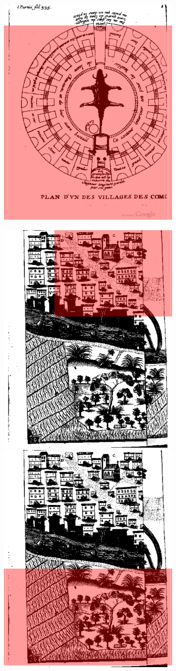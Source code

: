 \begin{figure}[H]
\begin{subfigure}[b]{0.49\textwidth}
		\includegraphics[width=.49\textwidth]{resources/good_extract_pic}
	\end{subfigure}
	\begin{subfigure}[b]{0.49\textwidth}
		\includegraphics[width=.49\textwidth]{resources/bad_extract_pic5}
		\includegraphics[width=.49\textwidth]{resources/bad_extract_pic3}

\end{subfigure}
\end{figure}
